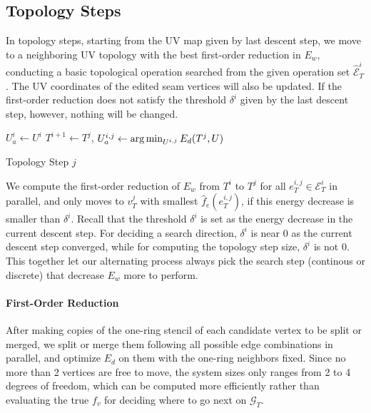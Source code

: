 
\subsection{Topology Steps}
\label{sec:topologyStep}

In topology steps, starting from the UV map given by last descent step, we move to a neighboring UV topology with the best first-order reduction in $E_w$, conducting a basic topological operation searched from the given operation set $\hat{\mathcal{E}}^i_T$. The UV coordinates of the edited seam vertices will also be updated. If the first-order reduction does not satisfy the threshold $\delta^i$ given by the last descent step, however, nothing will be changed.

\begin{algorithm}[h]
\SetAlgoLined
{}
$U_a^{i} \leftarrow U^i$\;
{
  $T^{i+1} \leftarrow T^j$, $U_a^{i,j} \leftarrow \operatorname*{arg\,min}_{U^{i,j}} E_d(T^j,U)$\;
}
\caption{Topology Step $j$}
\end{algorithm}
 
We compute the first-order reduction  of $E_w$ from $T^i$ to $T^j$ for all $e^{i,j}_T \in \mathcal{E}^i_T$ in parallel, and only moves to  $v^j_T$ with smallest $\hat{f}_e(e^{i,j}_{T})$, if this energy decrease is smaller than $\delta^i$. Recall that the threshold $\delta^i$ is set as the energy decrease in the current descent step. For deciding a search direction, $\delta^i$ is near $0$ as the current descent step converged, while for computing the topology step size, $\delta^i$ is not $0$. This together let our alternating process always pick the search step (continous or discrete) that decrease $E_w$ more to perform.

\paragraph{First-Order Reduction}
After making copies of the one-ring stencil of each candidate vertex to be split or merged, we split or merge them following all possible edge combinations in parallel, and optimize $E_d$ on them with the one-ring neighbors fixed. Since no more than 2 vertices are free to move, the system sizes only ranges from 2 to 4 degrees of freedom, which can be computed more efficiently rather than evaluating the true $f_v$ for deciding where to go next on $\mathcal{G}_T$.

